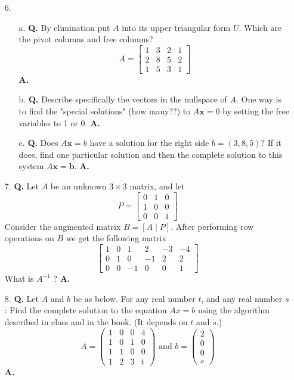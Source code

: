 \documentclass[main.tex]{subfiles}
\begin{document}
\begin{enumerate}
\item[6.] 
    \begin{enumerate}
    \item [a.] \textbf{Q.} By elimination put $A$ into its upper triangular form $U$. Which are the pivot columns and free columns?
    $$
    A=\left[\begin{array}{llll}
    1 & 3 & 2 & 1 \\
    2 & 8 & 5 & 2 \\
    1 & 5 & 3 & 1
    \end{array}\right]
    $$
    \textbf{A.}
    
    \item[b.] \textbf{Q.} Describe specifically the vectors in the nullspace of $A$. One way is to find the "special solutions" (how many??) to $A \boldsymbol{x}=0$ by setting the free variables to 1 or 0. \textbf{A.}
    
    \item[c.] \textbf{Q.}  Does $A \boldsymbol{x}=b$ have a solution for the right side $b=(3,8,5) ?$ If it does, find one particular solution and then the complete solution to this system $A \boldsymbol{x}=\boldsymbol{b}$. \textbf{A.}
    
    \end{enumerate}
    
\item[7.] \textbf{Q.} Let $A$ be an unknown $3 \times 3$ matrix, and let
    $$
    P=\left[\begin{array}{lll}
    0 & 1 & 0 \\
    1 & 0 & 0 \\
    0 & 0 & 1
    \end{array}\right]
    $$
    Consider the augmented matrix $B=[A \mid P]$. After performing row operations on $B$ we get the following matrix
    $$
    \left[\begin{array}{ccc|ccc}
    1 & 0 & 1 & 2 & -3 & -4 \\
    0 & 1 & 0 & -1 & 2 & 2 \\
    0 & 0 & -1 & 0 & 0 & 1
    \end{array}\right]
    $$
    What is $A^{-1}$ ?
    \textbf{A.}
    
\item[8.] \textbf{Q.} Let $A$ and $b$ be as below. For any real number $t$, and any real number $s$ : Find the complete solution to the equation $A x=b$ using the algorithm described in class and in the book. (It depends on $t$ and $s$.)
    $$
    A=\left(\begin{array}{llll}
    1 & 0 & 0 & 4 \\
    1 & 0 & 1 & 0 \\
    1 & 1 & 0 & 0 \\
    1 & 2 & 3 & t
    \end{array}\right) \text { and } b=\left(\begin{array}{l}
    2 \\
    0 \\
    0 \\
    s
    \end{array}\right)
    $$
    \textbf{A.}
    
\end{enumerate}
\end{document}
